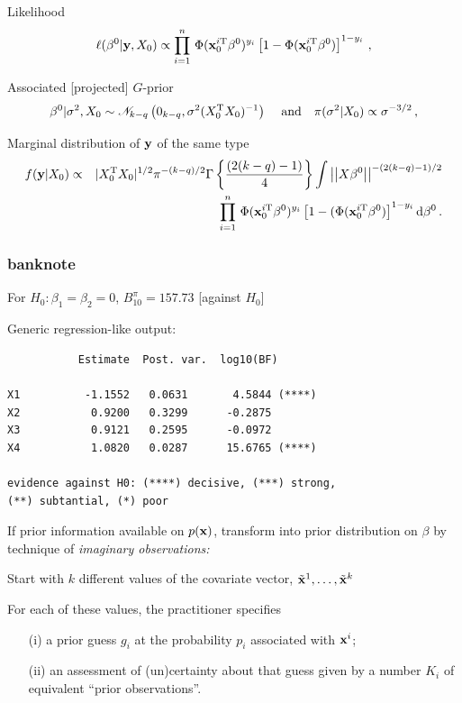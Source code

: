 \begin{slide}
\vs Likelihood
$$
\ell(\beta^0|\mathbf{y},X_0)\propto
\prod_{i=1}^n\,\Phi(\mathbf{x}_0^{i\mathrm{T}}\beta^0)^{y_i}
\left[1-\Phi(\mathbf{x}_0^{i\mathrm{T}}\beta^0)\right]^{1-y_i}\,,
$$

\end{slide}\begin{slide}

Associated [projected] $G$-prior
$$
\beta^0|\sigma^2,X_0\sim\mathscr{N}_{k-q}\left(0_{k-q},\sigma^2(X_0^{\mathrm{T}}
X_0)^{-1}\right)\, \quad \text{and} \quad \pi(\sigma^2|X_0)\propto
\sigma^{-3/2} \,,
$$

\vs\pause
Marginal distribution of $\mathbf{y}$ of the same type\footnotesize
\begin{eqnarray*}
f(\mathbf{y}|X_0) & \propto & |X_0^{\mathrm{T}} X_0|^{1/2} \pi^{-(k-q)/2}\Gamma\left\{\frac{(2(k-q)-1)}{4}\right\} 
	\int \left|\left| X\beta^0\right|\right|^{-(2(k-q)-1)/2} \\
             && \quad\prod_{i=1}^n\,\Phi(\mathbf{x}_0^{i\mathrm{T}}\beta^0)^{y_i} \left[1-(\Phi(\mathbf{x}_0^{i\mathrm{T}}\beta^0)\right]^{1-y_i}
\text{d}\beta^0\,.
\end{eqnarray*}\normalsize

\end{slide}
\begin{frame}[fragile]
\frametitle{{\sf banknote}}

For $H_0:\beta_1=\beta_2=0$, $B^\pi_{10}=157.73$ [against $H_0$]

\vs Generic regression-like output:
\small
\begin{verbatim}
           Estimate  Post. var.  log10(BF)

X1          -1.1552   0.0631       4.5844 (****)
X2           0.9200   0.3299      -0.2875
X3           0.9121   0.2595      -0.0972
X4           1.0820   0.0287      15.6765 (****)

evidence against H0: (****) decisive, (***) strong,
(**) subtantial, (*) poor
\end{verbatim}
\normalsize

\end{frame}
\begin{slide}

If prior information available on $p(\mathbf{x})$, transform 
into prior distribution on $\beta$ by technique of {\em 
imaginary observations:}

\vs\pause
Start with $k$ different values of the covariate vector, $\tilde {\mathbf{x}}^1,\ldots,\tilde {\mathbf{x}}^k$

For each of these values, the practitioner specifies 
\begin{itemize}
\item[(i)]  a prior guess $g_i$ at the probability $p_i$ associated with $\mathbf{x}^i$;
\item[(ii)] an assessment of (un)certainty about that guess given by a number $K_i$ of
equivalent ``prior observations''.
\end{itemize}

\pause
\centerline{{}}

\end{slide}
